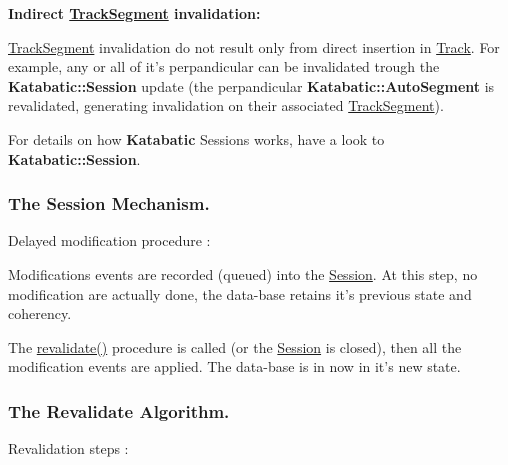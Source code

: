 {\bfseries Indirect \hyperlink{classKite_1_1TrackSegment}{Track\-Segment} invalidation\-:}
\begin{DoxyItemize}
\item \hyperlink{classKite_1_1TrackSegment}{Track\-Segment} invalidation do not result only from direct insertion in \hyperlink{classKite_1_1Track}{Track}. For example, any or all of it's perpandicular can be invalidated trough the {\bf Katabatic\-::\-Session} update (the perpandicular {\bf Katabatic\-::\-Auto\-Segment} is revalidated, generating invalidation on their associated \hyperlink{classKite_1_1TrackSegment}{Track\-Segment}).
\end{DoxyItemize}

For details on how {\bf Katabatic} Sessions works, have a look to {\bf Katabatic\-::\-Session}.\hypertarget{classKite_1_1Session_secSessionMechanism}{}\subsubsection{The Session Mechanism.}\label{classKite_1_1Session_secSessionMechanism}
Delayed modification procedure \-:
\begin{DoxyItemize}
\item Modifications events are recorded (queued) into the \hyperlink{classKite_1_1Session}{Session}. At this step, no modification are actually done, the data-\/base retains it's previous state and coherency.
\item The {\ttfamily \hyperlink{classKite_1_1Session_a5bd93abe1416952ace15a98dbeeed124}{revalidate()}} procedure is called (or the \hyperlink{classKite_1_1Session}{Session} is closed), then all the modification events are applied. The data-\/base is in now in it's new state.
\end{DoxyItemize}\hypertarget{classKite_1_1Session_secKiteSessionRevalidate}{}\subsubsection{The Revalidate Algorithm.}\label{classKite_1_1Session_secKiteSessionRevalidate}
Revalidation steps \-:
